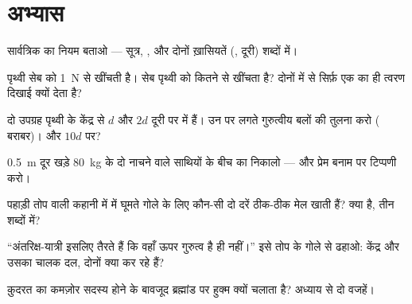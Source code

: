 \section{अभ्यास}

\begin{exercise}[$\star$]\label{exo:g9:gravitation:1}
सार्वत्रिक  का नियम बताओ --- सूत्र, , और दोनों
ख़ासियतें (, दूरी) शब्दों में।
\end{exercise}

\begin{exercise}[$\star$]\label{exo:g9:gravitation:2}
पृथ्वी सेब को \qty{1}{N} से खींचती है। सेब पृथ्वी को कितने  से
खींचता है? दोनों में से सिर्फ़ एक का ही त्वरण दिखाई क्यों देता है?
\end{exercise}

\begin{exercise}[$\star$]\label{exo:g9:gravitation:3}
दो उपग्रह पृथ्वी के केंद्र से $d$ और $2d$ दूरी पर  में हैं। उन
पर लगते गुरुत्वीय बलों की तुलना करो ( बराबर)। और $10 d$ पर?
\end{exercise}

\begin{exercise}[$\star$]\label{exo:g9:gravitation:4}
\qty{0.5}{m} दूर खड़े \qty{80}{kg} के दो नाचने वाले साथियों के बीच का
 निकालो --- और प्रेम बनाम  पर टिप्पणी करो।
\end{exercise}

\begin{exercise}[$\star$]\label{exo:g9:gravitation:5}
पहाड़ी तोप वाली कहानी में  में घूमते गोले के लिए कौन-सी दो दरें
ठीक-ठीक मेल खाती हैं?  क्या है, तीन शब्दों में?
\end{exercise}

\begin{exercise}[$\star$]\label{exo:g9:gravitation:6}
``अंतरिक्ष-यात्री इसलिए तैरते हैं कि वहाँ ऊपर गुरुत्व है ही नहीं।''
इसे तोप के गोले से ढहाओ: केंद्र और उसका चालक दल, दोनों क्या कर रहे
हैं?
\end{exercise}

\begin{exercise}[$\star$]\label{exo:g9:gravitation:7}
क़ुदरत का कमज़ोर सदस्य होने के बावजूद  ब्रह्मांड पर हुक्म
क्यों चलाता है? अध्याय से दो वजहें।
\end{exercise}

